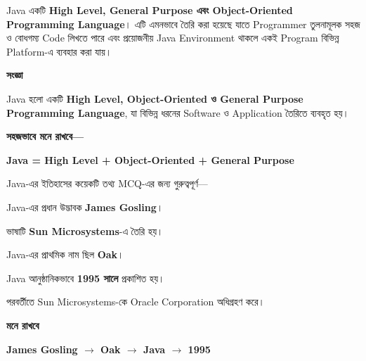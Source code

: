 
Java একটি \textbf{High Level, General Purpose এবং Object-Oriented
Programming Language}। এটি এমনভাবে তৈরি করা হয়েছে যাতে Programmer
তুলনামূলক সহজ ও বোধগম্য Code লিখতে পারে এবং প্রয়োজনীয় Java
Environment থাকলে একই Program বিভিন্ন Platform-এ ব্যবহার করা যায়।


\begin{definitionbox}

\textbf{\color{darkTeal}সংজ্ঞা}

Java হলো একটি \textbf{High Level, Object-Oriented ও General Purpose
Programming Language}, যা বিভিন্ন ধরনের Software ও Application
তৈরিতে ব্যবহৃত হয়।

\end{definitionbox}

\textbf{সহজভাবে মনে রাখবে—}

\begin{center}

\textbf{
Java
=
High Level
+
Object-Oriented
+
General Purpose
}

\end{center}


Java-এর ইতিহাসের কয়েকটি তথ্য MCQ-এর জন্য গুরুত্বপূর্ণ—

\begin{compacttwocolpoints}

\item Java-এর প্রধান উদ্ভাবক \textbf{James Gosling}।

\item ভাষাটি \textbf{Sun Microsystems}-এ তৈরি হয়।

\item Java-এর প্রাথমিক নাম ছিল \textbf{Oak}।

\item Java আনুষ্ঠানিকভাবে \textbf{1995 সালে} প্রকাশিত হয়।

\item পরবর্তীতে Sun Microsystems-কে Oracle Corporation অধিগ্রহণ করে।

\end{compacttwocolpoints}

\begin{rememberbox}

\textbf{\color{deepOrange}মনে রাখবে}

\begin{center}

\textbf{
James Gosling
\(\rightarrow\)
Oak
\(\rightarrow\)
Java
\(\rightarrow\)
1995
}

\end{center}

\end{rememberbox}

